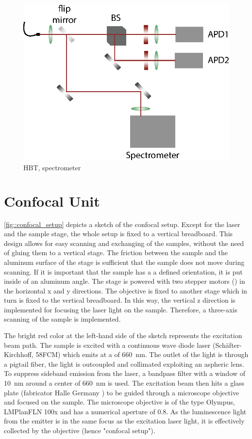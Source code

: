 	\begin{figure}[t] %
		\centering
		\includegraphics[width=\linewidth]{./pics/hbt_spectrometer.eps}
		\caption{HBT, spectrometer}
		\label{fig::hbt_spectrometer}
	\end{figure}

	\section[Confocal Unit]{Confocal Unit}

		\autoref{fig::confocal_setup} depicts a sketch of the confocal setup. 
		Except for the laser and the sample stage, the whole setup is fixed to a vertical breadboard. 
		This design allows for easy scanning and exchanging of the samples, without the need of gluing them to a vertical stage.
		The friction between the sample and the aluminum surface of the stage is sufficient that the sample does not move during scanning.
		If it is important that the sample has a a defined orientation, it is put inside of an aluminum angle.
		The stage is powered with two stepper motors () in the horizontal x and y directions.
		The objective is fixed to another stage which in turn is fixed to the vertical breadboard.
		In this way, the vertical z direction is implemented for focusing the laser light on the sample.
		Therefore, a three-axis scanning of the sample is implemented.

		The bright red color at the left-hand side of the sketch represents the excitation beam path.
		The sample is excited with a continuous wave diode laser (Sch\"after-Kirchhoff, 58FCM) which emits at a \wl of \SI{660}{\nano\meter}.
		The outlet of the light is through a pigtail fiber, the light is outcoupled and collimated exploiting an aspheric lens.
		To suppress sideband emission from the laser, a bandpass filter with a window of  \SI{10}{\nm} around a center of \SI{660}{\nm} is used.
		The excitation beam then hits a glass plate (fabricator Halle Germany ) to be guided through a microscope objective and focused on the sample.
		The microscope objective is of the type Olympus, LMPlanFLN 100x and has a numerical aperture of 0.8.
		As the luminescence light from the emitter is in the same focus as the excitation laser light, it is effectively collected by the objective (hence "confocal setup").

